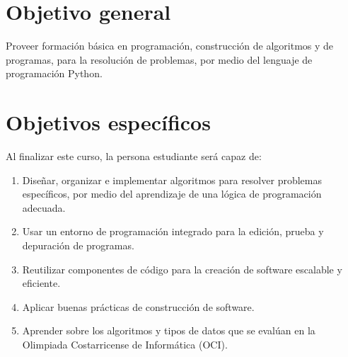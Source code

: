 \section{Objetivo general}

Proveer formación básica en programación, construcción de algoritmos y de programas, para la resolución de problemas, por medio del lenguaje de programación Python.

\section{Objetivos específicos}

Al finalizar este curso, la persona estudiante será capaz de:

\begin{enumerate}
  \item Diseñar, organizar e implementar algoritmos para resolver problemas específicos, por medio del aprendizaje de una lógica de programación adecuada.
  \item Usar un entorno de programación integrado para la edición, prueba y depuración de programas.
  \item Reutilizar componentes de código para la creación de software escalable y eficiente.
  \item Aplicar buenas prácticas de construcción de software.
  \item Aprender sobre los algoritmos y tipos de datos que se evalúan en la Olimpiada Costarricense de Informática (OCI).
\end{enumerate}

